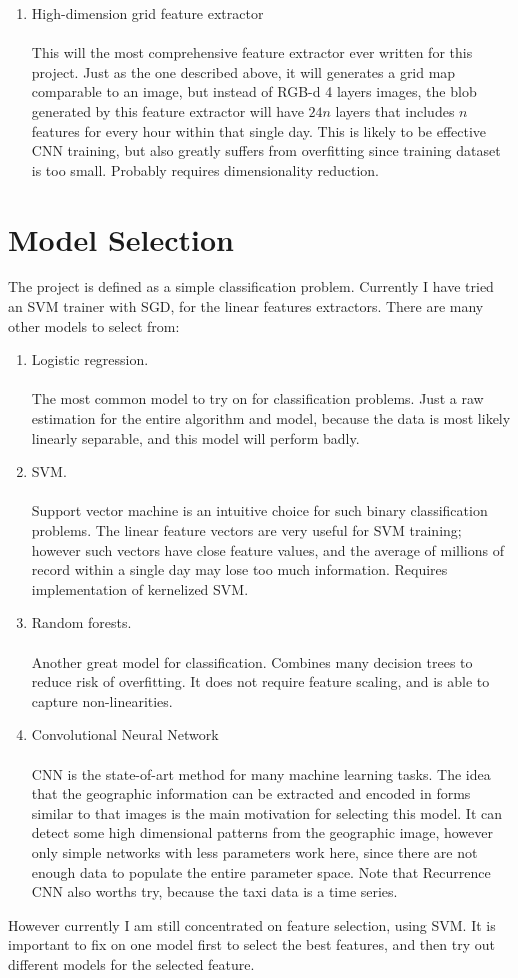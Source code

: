 \documentclass[a4paper]{article}
\begin{document}
\begin{enumerate}
\item High-dimension grid feature extractor\\\\
This will the most comprehensive feature extractor ever written for this project. Just as the one described above, it will generates a grid map comparable to an image, but instead of RGB-d 4 layers images, the blob generated by this feature extractor will have $24n$ layers that includes $n$ features for every hour within that single day. This is likely to be effective CNN training, but also greatly suffers from overfitting since training dataset is too small. Probably requires dimensionality reduction.
\end{enumerate}
\section{Model Selection}
The project is defined as a simple classification problem. Currently I have tried an SVM trainer with SGD, for the linear features extractors. 
There are many other models to select from:
\begin{enumerate}
\item Logistic regression. \\\\
The most common model to try on for classification problems. Just a raw estimation for the entire algorithm and model, because the data is most likely linearly separable, and this model will perform badly. 
\item SVM. \\\\
Support vector machine is an intuitive choice for such binary classification problems. The linear feature vectors are very useful for SVM training; however such vectors have close feature values, and the average of millions of record within a single day may lose too much information. Requires implementation of kernelized SVM. 
\item Random forests. \\\\
Another great model for classification. Combines many decision trees to reduce risk of overfitting. It does not require feature scaling, and is able to capture non-linearities. 
\item Convolutional Neural Network\\\\
CNN is the state-of-art method for many machine learning tasks. The idea that the geographic information can be extracted and encoded in forms similar to that images is the main motivation for selecting this model. It can detect some high dimensional patterns from the geographic image, however only simple networks with less parameters work here, since there are not enough data to populate the entire parameter space. Note that Recurrence CNN also worths try, because the taxi data is a time series.
\end{enumerate}
However currently I am still concentrated on feature selection, using SVM. It is important to fix on one model first to select the best features, and then try out different models for the selected feature. 
\end{document}
